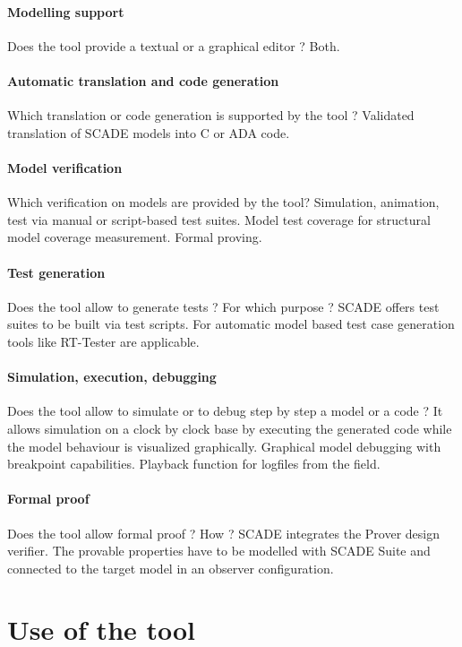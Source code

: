 \paragraph{Modelling support}
Does the tool provide a  textual or a graphical editor ? 
Both.

\paragraph{Automatic translation and code generation}
Which translation or code generation is supported by the tool ?
Validated translation of SCADE models into C or ADA code.

\paragraph{Model verification}
Which verification on models are provided by the tool?
Simulation, animation, test via manual or script-based test suites. 
Model test coverage for structural model coverage measurement.
Formal proving.

\paragraph{Test generation}
Does the tool allow to generate tests ? For  which purpose ?
SCADE offers test suites to be built via test scripts. For automatic model based test case generation tools like RT-Tester are applicable.

\paragraph{Simulation, execution, debugging}
Does the tool allow to simulate or to debug step by step a model or a code ?
It allows simulation on a clock by clock base by executing the generated code while the model behaviour is visualized graphically. Graphical model debugging with breakpoint capabilities. Playback function for logfiles from the field. 

\paragraph{Formal proof}
Does the tool allow formal proof ?  How ?
SCADE integrates the Prover design verifier. The provable properties have to be modelled with SCADE Suite and connected to the target model in an observer configuration.   



\section{Use of the tool}


